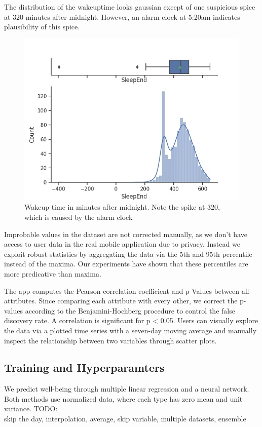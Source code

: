 \documentclass[conference]{IEEEtran}
\begin{document}
The distribution of the wakeuptime looks gaussian except of one suspicious spice at 320 minutes after midnight. However, an alarm clock at 5:20am indicates plausibility of this spice.
\begin{figure}[htbp]
\begin{center}
\includegraphics[width=1\linewidth]{figs/SleepEnd.png}
\caption{Wakeup time in minutes after midnight. Note the spike at 320, which is caused by the alarm clock}
\label{fig:alarm}
\end{center}
\end{figure}

Improbable values in the dataset are not corrected manually, as we don't have access to user data in the real mobile application due to privacy.
Instead we exploit robust statistics by aggregating the data via the 5th and 95th percentile instead of the maxima. Our experiments have shown that these percentiles are more predicative than maxima.


The app computes the Pearson correlation coefficient and p-Values between all attributes. Since comparing each attribute with every other, we correct the p-values according to the Benjamini-Hochberg procedure to control the false discovery rate.
A correlation is significant for p < 0.05.
Users can visually explore the data via a plotted time series with a seven-day moving average and manually inspect the relationship between two variables through scatter plots.


\subsection{Training and Hyperparamters} 
We predict well-being through multiple linear regression and a neural network. Both methods use normalized data, where each type has zero mean and unit variance.
\color{red}
TODO:\\
skip the day, interpolation, average, skip variable, multiple datasets, ensemble
\color{black}
\end{document}
